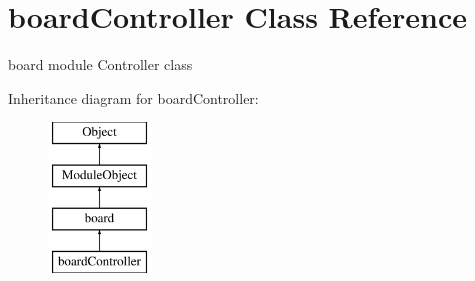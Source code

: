 \hypertarget{classboardController}{}\section{board\+Controller Class Reference}
\label{classboardController}


board module Controller class  


Inheritance diagram for board\+Controller\+:\begin{figure}[H]
\begin{center}
\leavevmode
\includegraphics[height=4.000000cm]{classboardController}
\end{center}
\end{figure}
